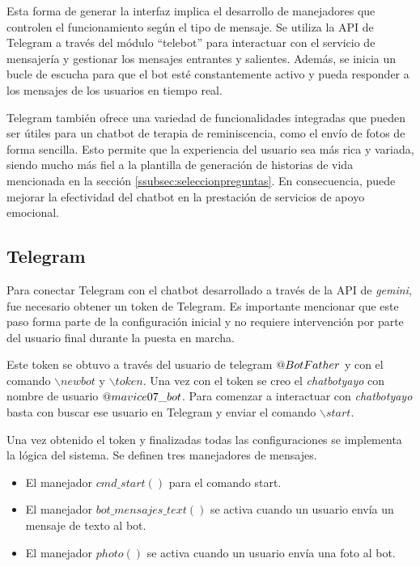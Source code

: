 Esta forma de generar la interfaz implica el desarrollo de manejadores que controlen el funcionamiento según el tipo de mensaje. 
Se utiliza la API de Telegram a través del módulo ``telebot'' para interactuar con el servicio de mensajería y gestionar los mensajes entrantes y salientes. Además, se inicia un bucle de escucha para que el bot esté constantemente activo y pueda responder a los mensajes de los usuarios en tiempo real.

Telegram también ofrece una variedad de funcionalidades integradas que pueden ser útiles para un chatbot de terapia de reminiscencia, como el envío de fotos de forma sencilla. Esto permite que la experiencia del usuario sea más rica y variada, siendo mucho más fiel a la plantilla de generación de historias de vida mencionada en la sección \ref{ssubsec:seleccionpreguntas}. En consecuencia, puede mejorar la efectividad del chatbot en la prestación de servicios de apoyo emocional.

\subsection{Telegram}
\label{sec:Telegram}

Para conectar Telegram con el chatbot desarrollado a través de la API de \textit{gemini}, fue necesario obtener un token de Telegram. Es importante mencionar que este paso forma parte de la configuración inicial y no requiere intervención por parte del usuario final durante la puesta en marcha.

Este token se obtuvo a través del usuario de telegram $\makeatletter @ BotFather$ y con el comando $\backslash newbot$ y $\backslash token$. Una vez con el token se creo el \textit{chatbotyayo} con nombre de usuario $\makeatletter @ mavice07\_bot$. Para comenzar a interactuar con \textit{chatbotyayo} basta con buscar ese usuario en Telegram y enviar el comando $\backslash start$. 

Una vez obtenido el token y finalizadas todas las configuraciones se implementa la lógica del sistema. Se definen tres manejadores de mensajes.
\begin{itemize}
	\item El manejador $cmd\_start()$ para el comando start. 
	
	\item El manejador $bot\_mensajes\_text()$ se activa cuando un usuario envía un mensaje de texto al bot.
	
	\item El manejador $photo()$ se activa cuando un usuario envía una foto al bot. 
\end{itemize}

